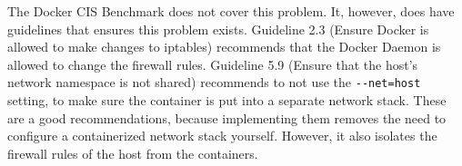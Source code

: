 \hfill

The Docker CIS Benchmark does not cover this problem. It, however, does have guidelines that ensures this problem exists. Guideline 2.3 (Ensure Docker is allowed to make changes to iptables) recommends that the Docker Daemon is allowed to change the firewall rules. Guideline 5.9 (Ensure that the host's network namespace is not shared) recommends to not use the \lstinline{--net=host} setting, to make sure the container is put into a separate network stack. These are a good recommendations, because implementing them removes the need to configure a containerized network stack yourself. However, it also isolates the firewall rules of the host from the containers.
